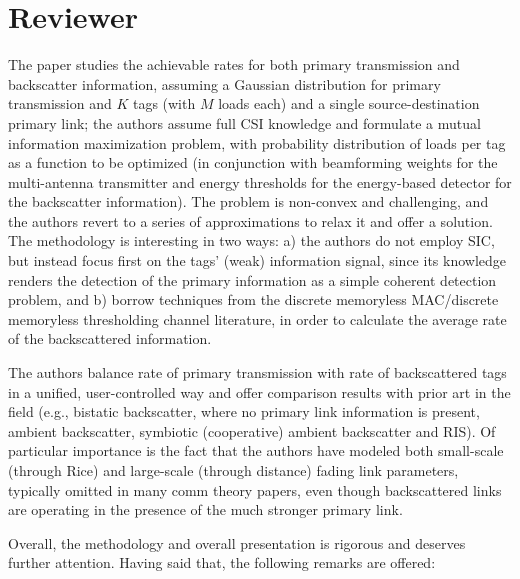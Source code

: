 \documentclass[10pt]{scrartcl}
\newcounter{rpntcnt}
\newcounter{revcnt}
\newenvironment{reviewer}{%
	\refstepcounter{revcnt}%
	\setcounter{rpntcnt}{0}%
	\section*{Reviewer \therevcnt}%
}{}
\begin{document}
\begin{reviewer}
	The paper studies the achievable rates for both primary transmission and backscatter information, assuming a Gaussian distribution for primary transmission and $K$ tags (with $M$ loads each) and a single source-destination primary link; the authors assume full CSI knowledge and formulate a mutual information maximization problem, with probability distribution of loads per tag as a function to be optimized (in conjunction with beamforming weights for the multi-antenna transmitter and energy thresholds for the energy-based detector for the backscatter information). The problem is non-convex and challenging, and the authors revert to a series of approximations to relax it and offer a solution. The methodology is interesting in two ways: a) the authors do not employ SIC, but instead focus first on the tags' (weak) information signal, since its knowledge renders the detection of the primary information as a simple coherent detection problem, and b) borrow techniques from the discrete memoryless MAC/discrete memoryless thresholding channel literature, in order to calculate the average rate of the backscattered information.

	The authors balance rate of primary transmission with rate of backscattered tags in a unified, user-controlled way and offer comparison results with prior art in the field (e.g., bistatic backscatter, where no primary link information is present, ambient backscatter, symbiotic (cooperative) ambient backscatter and RIS). Of particular importance is the fact that the authors have modeled both small-scale (through Rice) and large-scale (through distance) fading link parameters, typically omitted in many comm theory papers, even though backscattered links are operating in the presence of the much stronger primary link.

	Overall, the methodology and overall presentation is rigorous and deserves further attention. Having said that, the following remarks are offered:


\end{reviewer}
\end{document}
